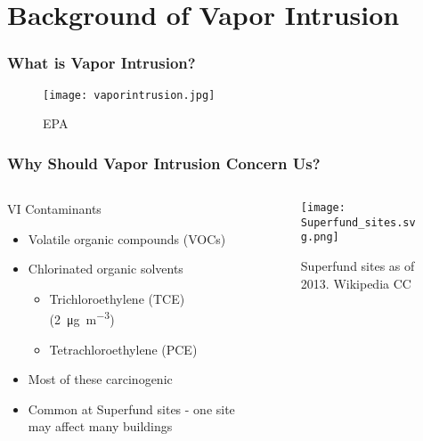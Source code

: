 \section{Background of Vapor Intrusion}

\begin{frame}
  \frametitle{What is Vapor Intrusion?}
  \begin{figure}
    \centering
    \texttt{[image: vaporintrusion.jpg]}
    \caption{\tiny{EPA\cite{us_epa_what_2015}}}
  \end{figure}
\end{frame}

\begin{frame}
  \frametitle{Why Should Vapor Intrusion Concern Us?}
  \begin{columns}[T]
    \begin{column}{0.5\textwidth}
      \begin{block}{VI Contaminants}
        \begin{itemize}
          \item Volatile organic compounds (VOCs)
          \item Chlorinated organic solvents
          \begin{itemize}
            \item Trichloroethylene (TCE) (\SI{2}{\micro\gram\per\metre\cubed})
            \item Tetrachloroethylene (PCE)
          \end{itemize}
          \item Most of these carcinogenic
          \item Common at Superfund sites - one site may affect many buildings
        \end{itemize}
      \end{block}
    \end{column}
    \begin{column}{0.5\textwidth}
      \begin{figure}
        \centering
        \texttt{[image: Superfund\_sites.svg.png]}
        \caption{Superfund sites as of 2013. \tiny{Wikipedia CC\cite{skew-t_filesuperfund_nodate}}}
      \end{figure}
    \end{column}
  \end{columns}
\end{frame}

